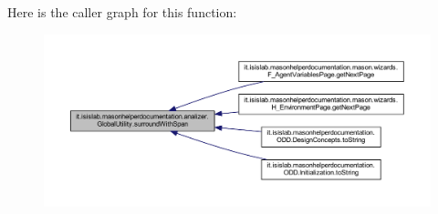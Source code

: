 Here is the caller graph for this function\-:\nopagebreak
\begin{figure}[H]
\begin{center}
\leavevmode
\includegraphics[width=350pt]{classit_1_1isislab_1_1masonhelperdocumentation_1_1analizer_1_1_global_utility_a38ddfbe46096d9a315a9b2e5aba82569_icgraph}
\end{center}
\end{figure}




